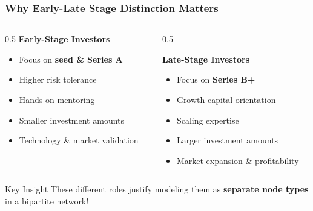 \begin{frame}
\frametitle{Why Early-Late Stage Distinction Matters}

\begin{columns}
\begin{column}{0.5\textwidth}
\textbf{Early-Stage Investors}
\begin{itemize}
    \item Focus on \textbf{seed \& Series A}
    \item Higher risk tolerance
    \item Hands-on mentoring
    \item Smaller investment amounts
    \item Technology \& market validation
\end{itemize}
\end{column}

\begin{column}{0.5\textwidth}

\textbf{Late-Stage Investors}
\begin{itemize}
    \item Focus on \textbf{Series B+}
    \item Growth capital orientation
    \item Scaling expertise
    \item Larger investment amounts
    \item Market expansion \& profitability
\end{itemize}
\end{column}
\end{columns}

\begin{alertblock}{Key Insight}
These different roles justify modeling them as \textbf{separate node types} in a bipartite network!
\end{alertblock}

\end{frame}
